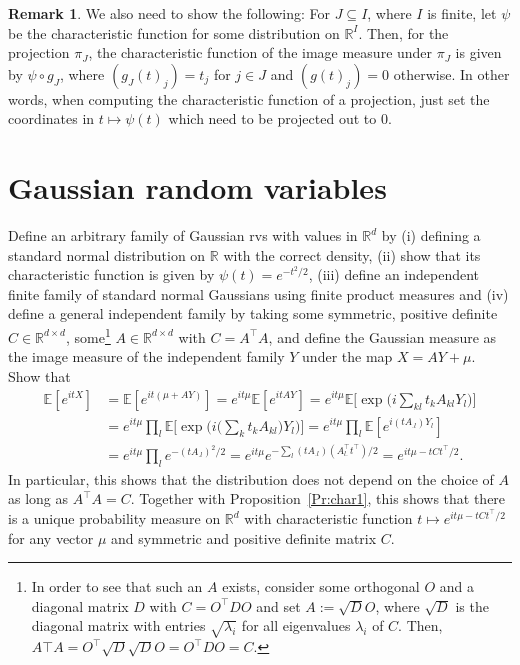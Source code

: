 \documentclass{article}
\theoremstyle{definition}
\newtheorem{remark}[proposition]{Remark}
\theoremstyle{step} \newtheorem{step}{Step}
\begin{document}
\begin{remark}\label{rem:proj}
  We also need to show the following: For $J \subseteq I$, where $I$
  is finite, let $\psi$ be the characteristic function for some
  distribution on $\mathbb R^I$. Then, for the projection $\pi_J$, the
  characteristic function of the image measure under $\pi_J$ is given
  by $\psi \circ g_J$, where $(g_J(t)_j) = t_j$ for $j\in J$ and
  $(g(t)_j) = 0$ otherwise. In other words, when computing the
  characteristic function of a projection, just set the coordinates in
  $t \mapsto \psi(t)$ which need to be projected out to $0$.
\end{remark}

\section{Gaussian random variables}
Define an arbitrary family of Gaussian rvs with values in $\mathbb
  R^d$ by (i) defining a standard normal distribution on $\mathbb R$
with the correct density, (ii) show that its characteristic function
is given by $\psi(t) = e^{-t^2/2}$, (iii) define an independent finite
family of standard normal Gaussians using finite product measures and
(iv) define a general independent family by taking some symmetric,
positive definite $C \in \mathbb R^{d\times d}$, some\footnote{In
  order to see that such an $A$ exists, consider some orthogonal $O$
  and a diagonal matrix $D$ with $C = O^\top DO$ and set $A :=
    \sqrt{D} O$, where $\sqrt{D}$ is the diagonal matrix with entries
  $\sqrt{\lambda_i}$ for all eigenvalues $\lambda_i$ of $C$. Then,
  $A\top A = O^\top \sqrt{D}\sqrt{D} O = O^\top D O = C$.} $A \in
  \mathbb R^{d\times d}$ with $C = A^\top A$, and define the Gaussian
measure as the image measure of the independent family $Y$ under the
map $X = A Y + \mu$. Show that
\begin{align*}
  \mathbb E[e^{itX}] & = \mathbb E[e^{it(\mu + AY)}] = e^{it\mu}
  \mathbb E[e^{itAY}] = e^{it\mu} \mathbb E\Big[\exp\Big(i \sum_{kl}
    t_k A_{kl} Y_l\Big)\Big]                                     \\ & = e^{it\mu} \prod_{l} \mathbb
  E\Big[\exp\Big(i \big(\sum_{k} t_k A_{kl}\big) Y_l\Big)\Big] =
  e^{it\mu} \prod_{l} \mathbb E[e^{i (tA_{.l}) Y_l}]             \\ & =
  e^{it\mu} \prod_{l} e^{-(tA_{.l})^2/2} = e^{it\mu} e^{-\sum_l
      (tA_{.l})(A^\top_{l.}t^\top)/2} = e^{it\mu -tCt^\top/2}.
\end{align*}
In particular, this shows that the distribution does not depend on the
choice of $A$ as long as $A^\top A = C$. Together with
Proposition~\ref{Pr:char1}, this shows that there is a unique
probability measure on $\mathbb R^d$ with characteristic function
$t\mapsto e^{it\mu -tCt^\top/2}$ for any vector $\mu$ and symmetric
and positive definite matrix $C$.
\end{document}
